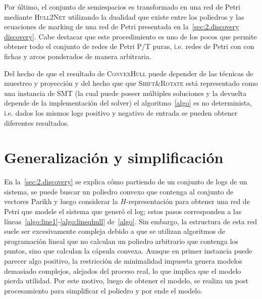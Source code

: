 Por último, el conjunto de semiespacios es transformado en una red de Petri mediante \textsc{Hull2Net} utilizando
la dualidad que existe entre los poliedros y las ecuaciones de marking de una red de Petri
presentada en la~\autoref{sec:2.discovery discovery}.
Cabe destacar que este procedimiento es uno de los pocos que permite obtener todo el conjunto de redes de Petri P/T puras,
i.e. redes de Petri con con fichas y arcos ponderados de manera arbitraria.

Del hecho de que el resultado de \textsc{ConvexHull} puede depender de las técnicas de muestreo y proyección y del
hecho que que \textsc{Shift\&Rotate} está representado como una instancia de SMT (la cual puede poseer múltiples soluciones
y la devuelta depende de la implementación del solver) el algoritmo~\autoref{algo} es no determinista, i.e. dados
los mismos logs positivo y negativo de entrada se pueden obtener diferentes resultados.

    
\section{Generalización y simplificación}
\label{sec:3.gensimp}

En la~\autoref{sec:2.discovery} se explica cómo partiendo de un conjunto de logs de un sistema, se puede
buscar un poliedro convexo que contenga al conjunto de vectores Parikh y luego considerar la $H$-representación para
obtener una red de Petri que modele el sistema que generó el log; estos pasos corresponden
a las líneas~\ref{algo:line1}-\ref{algo:lineqhull} de~\autoref{algo}.
Sin embargo, la estructura de esta red suele ser excesivamente compleja debido a que se utilizan 
algoritmos de programación lineal que no calculan un poliedro arbitrario que contenga los puntos,
sino que calculan la cápsula convexa. Aunque en primer instancia puede parecer algo positivo, la restricción
de minimalidad impuesta genera modelos demasiado complejos, alejados del proceso real, lo que
implica que el modelo pierda utilidad. Por este motivo, luego de obtener el modelo, se realiza un post
procesamiento para simplificar el poliedro y por ende el modelo.

